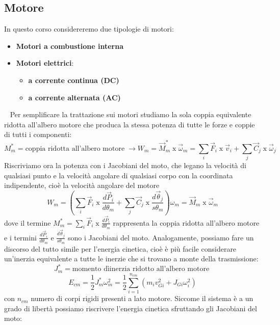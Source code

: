\subsection{Motore}
In questo corso considereremo due tipologie di motori:
\begin{itemize}
    \item \textbf{Motori a combustione interna}
    \item \textbf{Motori elettrici}:
    \begin{itemize}
        \item \textbf{a corrente continua (DC)}
        \item \textbf{a corrente alternata (AC)}
    \end{itemize}
\end{itemize}
\ \newline
Per semplificare la trattazione sui motori studiamo la sola coppia equivalente ridotta all'albero motore che produca la stessa potenza di tutte le forze e coppie di tutti i componenti:
\[
    M_m^* = \text{coppia ridotta all'albero motore}\; \rightarrow  W_m = \vec{M}_m^* \;\text{x}\;\vec{\omega}_m = \sum_i \vec{F}_i \;\text{x}\;\vec{v}_i + \sum_j \vec{C}_j \;\text{x}\;\vec{\omega}_j
\]
Riscriviamo ora la potenza con i Jacobiani del moto, che legano la velocità di qualsiasi punto e la velocità angolare di qualsiasi corpo con la coordinata indipendente, cioè la velocità angolare del motore
\[
    W_m = \left(\sum_i \vec{F}_i \;\text{x}\; \frac{d \vec{P}_i}{d \theta_m} + \sum_j \vec{C}_j \;\text{x}\;\frac{d \vec{\theta}_j}{s \theta_m} \right) \omega_m = \vec{M}_m \;\text{x}\;\vec{\omega}_m
\]
dove il termine $M_m^* = \sum_i \vec{F}_i \;\text{x}\; \frac{d \vec{P}_i}{d \theta_m}$ rappresenta la coppia ridotta all'albero motore e i termini $\frac{d \vec{P}_i}{d \theta_m}$ e $\frac{d \vec{\theta}_j}{s \theta_m}$ sono i Jacobiani del moto.\newline
\newline
Analogamente, possiamo fare un discorso del tutto simile per l'energia cinetica, cioè è più facile considerare un'inerzia equivalente a tutte le inerzie che si trovano a monte della trasmissione:
\[
    J_m^* = \text{momento dìinerzia ridotto all'albero motore}\;
\]
\[
    E_{cm} = \frac{1}{2} J_m^* \omega_m^2 = \frac{1}{2}\sum_{i=1}^{n_{cm}}\left( m_i v_{Gi}^2 + J_{Gi} \omega_i^2 \right)
\]
con $n_{cm}$ numero di corpi rigidi presenti a lato motore.\newline
Siccome il sistema è a un grado di libertà possiamo riscrivere l'energia cinetica sfruttando gli Jacobiani del moto:
